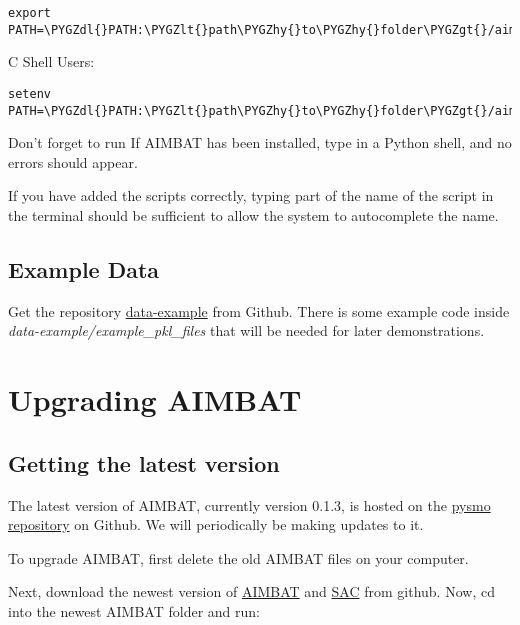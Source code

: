 \documentclass[letterpaper,10pt,english]{sphinxmanual}
\def\PYGZlt{\char`\<}
\def\PYGZgt{\char`\>}
\def\PYGZdl{\char`\$}
\def\PYGZhy{\char`\-}
\begin{document}
\begin{Verbatim}[commandchars=\\\{\}]
export PATH=\PYGZdl{}PATH:\PYGZlt{}path\PYGZhy{}to\PYGZhy{}folder\PYGZgt{}/aimbat/scripts
\end{Verbatim}

C Shell Users:

\begin{Verbatim}[commandchars=\\\{\}]
setenv PATH=\PYGZdl{}PATH:\PYGZlt{}path\PYGZhy{}to\PYGZhy{}folder\PYGZgt{}/aimbat/scripts
\end{Verbatim}

Don't forget to run  If AIMBAT has been installed, type  in a Python shell, and no errors should appear.

If you have added the scripts correctly, typing part of the name of the script in the terminal should be sufficient to allow the system to autocomplete the name.


\section{Example Data}
\label{docfiles/install_aimbat:example-data}
Get the repository \href{https://github.com/pysmo/data-example}{data-example} from Github. There is some example code inside \emph{data-example/example\_pkl\_files} that will be needed for later demonstrations.


\chapter{Upgrading AIMBAT}
\label{docfiles/upgrading_aimbat:upgrading-aimbat}\label{docfiles/upgrading_aimbat::doc}

\section{Getting the latest version}
\label{docfiles/upgrading_aimbat:getting-the-latest-version}
The latest version of AIMBAT, currently version 0.1.3, is hosted on the \href{https://github.com/pysmo}{pysmo repository} on Github. We will periodically be making updates to it.

To upgrade AIMBAT, first delete the old AIMBAT files on your computer.

Next, download the newest version of \href{https://github.com/pysmo/aimbat}{AIMBAT} and \href{https://github.com/pysmo/sac}{SAC} from github. Now, cd into the newest AIMBAT folder and run:
\end{document}
